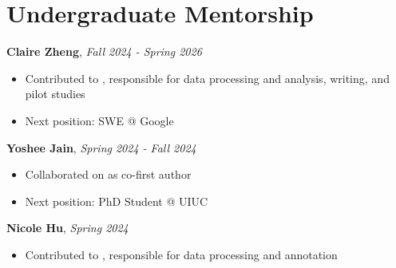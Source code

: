 \documentclass[10pt, letterpaper]{article}
\newif\ifshortcv
\newenvironment{highlights}{
    \begin{itemize}[
        topsep=0.10 cm,
        parsep=0.10 cm,
        partopsep=0pt,
        itemsep=0pt,
        leftmargin=0.4 cm + 10pt
    ]
}{
    \end{itemize}
} %
\newenvironment{onecolentry}{
    \begin{adjustwidth}{
        0.2 cm + 0.00001 cm
    }{
        0.2 cm + 0.00001 cm
    }
}{
    \end{adjustwidth}
} %
\begin{document}



    \section{Undergraduate Mentorship}
        
    \textbf{Claire Zheng}, \textit{Fall 2024 - Spring 2026}
        \ifshortcv\else
        \begin{highlights}
            \item Contributed to
            \cite{demirtacs2025generating,10.1145/3770762.3772574}, responsible for data processing and analysis, writing, and pilot studies 
            \item Next position: SWE @ Google
        \end{highlights}
        \fi
    
    \textbf{Yoshee Jain}, \textit{Spring 2024 - Fall 2024}
        \ifshortcv\else
        \begin{highlights}
            \item Collaborated on
            \cite{jain2025plaid} as co-first author
            \item Next position: PhD Student @ UIUC
        \end{highlights}
        \fi

    \textbf{Nicole Hu}, \textit{Spring 2024} 
        \ifshortcv\else
        \begin{highlights}
            \item Contributed to 
            \cite{demirtacs2024validating}, responsible for data processing and annotation
        \end{highlights}
        \fi

    
\end{document}

